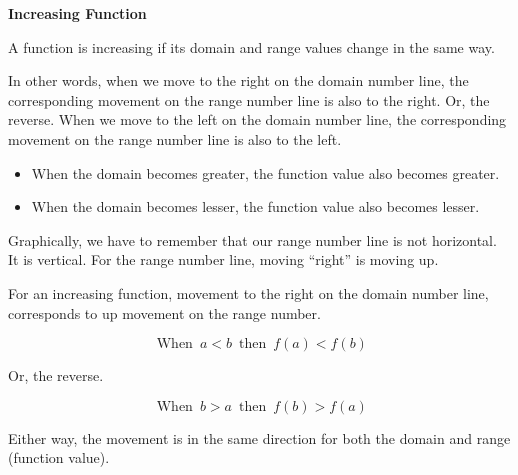 \documentclass{ximera}
\begin{document}
\begin{template} \textbf{\textcolor{blue!55!black}{Increasing Function}} 


A function is increasing if its domain and range values change in the same way. 


In other words, when we move to the right on the domain number line, the corresponding movement on the range number line is also to the right. Or, the reverse.  When we move to the left on the domain number line, the corresponding movement on the range number line is also to the left.

\begin{itemize}
\item When the domain becomes greater, the function value also becomes greater.
\item When the domain becomes lesser, the function value also becomes lesser.
\end{itemize}

Graphically, we have to remember that our range number line is not horizontal.  It is vertical.  For the range number line, moving ``right'' is moving up.


For an increasing function, movement to the right on the domain number line, corresponds to up movement on the range number. 



\[
\text{ When } \,  a < b \, \text{ then } \, f(a) < f(b)
\]


Or, the reverse.


\[
\text{ When } \,  b > a \, \text{ then } \, f(b) > f(a)
\]


Either way, the movement is in the same direction for both the domain and range (function value).


\end{template}
\end{document}
